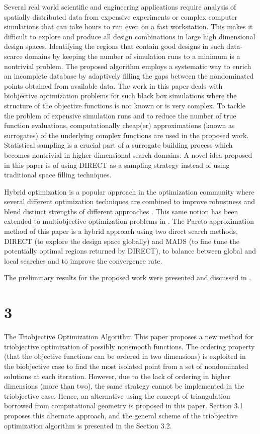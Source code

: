 Several real world scientific and engineering applications require analysis of 
spatially distributed data from expensive experiments or complex computer 
simulations that can take hours to run even on a fast workstation. This makes 
it difficult to explore and produce all design combinations in large high 
dimensional design spaces. Identifying the regions that contain good designs in 
such data-scarce domains by keeping the number of simulation runs to 
a minimum is a nontrivial problem. The proposed algorithm employs 
a systematic way to enrich an incomplete database by adaptively 
filling the gaps between the nondominated points obtained from available data. 
The work in this paper deals with biobjective optimization problems for 
such black box simulations where the structure of the objective functions is 
not known or is very complex. To tackle the problem of expensive simulation 
runs and to reduce the number of true function evaluations, computationally 
cheap(er) approximations (known as surrogates) of the underlying complex 
functions are used in the proposed work. Statistical sampling is a crucial 
part of a surrogate building process which becomes nontrivial in higher 
dimensional search domains. A novel idea proposed in this paper is of using 
DIRECT as a sampling strategy instead of using traditional space filling 
techniques. 

Hybrid optimization is a popular approach in the optimization community where 
several different optimization techniques are combined to improve robustness 
and blend distinct strengths of different approaches \GF. This same 
notion has been extended to multiobjective optimization problems in \WIHM. 
The Pareto approximation method of this paper is a hybrid approach using two 
direct search methods, DIRECT (to explore the design space globally) and 
MADS (to fine tune the potentially optimal regions returned by DIRECT), to 
balance between global and local searches and to improve the convergence rate.

The preliminary results for the proposed work were presented and discussed 
in \DWC. 

\section{3}{The Triobjective Optimization Algorithm}
This paper proposes a new method for triobjective optimization of possibly 
nonsmooth functions. The ordering property (that the objective functions 
can be ordered in two dimensions) is exploited in the biobjective case to 
find the most isolated point from a set of nondominated solutions at each 
iteration. However, due to the lack of ordering in higher dimensions (more than 
two), the same strategy cannot be implemented in the triobjective 
case. Hence, an alternative using the concept of triangulation borrowed 
from computational geometry is proposed in this paper. Section 3.1 proposes 
this alternate approach, and the general scheme of the triobjective 
optimization algorithm is presented in the Section 3.2.

